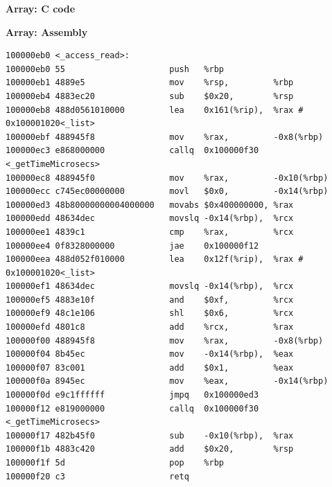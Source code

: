 \textbf{Array: C code}

\begin{Shaded}
\end{Shaded}

\textbf{Array: Assembly}

\begin{verbatim}
100000eb0 <_access_read>:
100000eb0 55                     push   %rbp
100000eb1 4889e5                 mov    %rsp,         %rbp
100000eb4 4883ec20               sub    $0x20,        %rsp
100000eb8 488d0561010000         lea    0x161(%rip),  %rax # 0x100001020<_list>
100000ebf 488945f8               mov    %rax,         -0x8(%rbp)
100000ec3 e868000000             callq  0x100000f30   <_getTimeMicrosecs>
100000ec8 488945f0               mov    %rax,         -0x10(%rbp)
100000ecc c745ec00000000         movl   $0x0,         -0x14(%rbp)
100000ed3 48b80000000004000000   movabs $0x400000000, %rax
100000edd 48634dec               movslq -0x14(%rbp),  %rcx
100000ee1 4839c1                 cmp    %rax,         %rcx
100000ee4 0f8328000000           jae    0x100000f12
100000eea 488d052f010000         lea    0x12f(%rip),  %rax # 0x100001020<_list>
100000ef1 48634dec               movslq -0x14(%rbp),  %rcx
100000ef5 4883e10f               and    $0xf,         %rcx
100000ef9 48c1e106               shl    $0x6,         %rcx
100000efd 4801c8                 add    %rcx,         %rax
100000f00 488945f8               mov    %rax,         -0x8(%rbp)
100000f04 8b45ec                 mov    -0x14(%rbp),  %eax
100000f07 83c001                 add    $0x1,         %eax
100000f0a 8945ec                 mov    %eax,         -0x14(%rbp)
100000f0d e9c1ffffff             jmpq   0x100000ed3
100000f12 e819000000             callq  0x100000f30   <_getTimeMicrosecs>
100000f17 482b45f0               sub    -0x10(%rbp),  %rax
100000f1b 4883c420               add    $0x20,        %rsp
100000f1f 5d                     pop    %rbp
100000f20 c3                     retq   
\end{verbatim}

